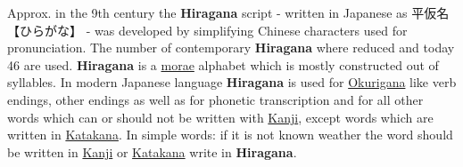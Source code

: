 

Approx. in the 9th century the \textbf{Hiragana} script - written in Japanese
as {平仮名} {【ひらがな】} - was developed by simplifying Chinese characters
used for pronunciation. The number of contemporary \textbf{Hiragana} where
reduced and today 46 are used. \textbf{Hiragana} is a
\hyperref[sec:Mora]{morae} alphabet which is mostly constructed out of
syllables. In modern Japanese language \textbf{Hiragana} is used for
\hyperref[sec:Okurigana]{Okurigana} like verb endings, other endings as well as
for phonetic transcription and for all other words which can or should not be
written with \hyperref[sec:Kanji]{Kanji}, except words which are written in
\hyperref[sec:Katakana]{Katakana}. In simple words: if it is not known weather
the word should be written in \hyperref[sec:Kanji]{Kanji} or
\hyperref[sec:Katakana]{Katakana} write in \textbf{Hiragana}.
